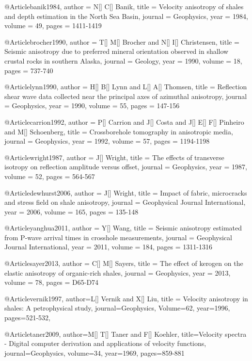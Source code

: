 @Article{banik1984,
  author = 	 {N[] C[] Banik},
  title = 	 {Velocity anisotropy of shales and depth estimation
in the North Sea Basin},
  journal = 	 {Geophysics},
  year = 	 1984,
  volume =	 49,
  pages =	 {1411-1419}
}

@Article{brocher1990,
  author = 	 {T[] M[] Brocher and N[] I[] Christensen},
  title = 	 {Seismic anisotropy due to preferred mineral orientation observed in shallow crustal rocks
in southern Alaska},
  journal = 	 {Geology},
  year = 	 1990,
  volume =	 18,
  pages =	 {737-740}
}

@Article{lynn1990,
  author = 	 {H[] B[] Lynn and L[] A[] Thomsen},
  title = 	 {Reflection shear wave data collected near the principal axes of azimuthal anisotropy},
  journal = 	 {Geophysics},
  year = 	 1990,
  volume =	 55,
  pages =	 {147-156}
}

@Article{carrion1992,
  author = 	 {P[] Carrion and J[] Costa and J[] E[] F[] Pinheiro and M[] Schoenberg},
  title = 	 {Crossborehole tomography in anisotropic media},
  journal = 	 {Geophysics},
  year = 	 1992,
  volume =	 57,
  pages =	 {1194-1198}
}

@Article{wright1987,
  author = 	 {J[] Wright},
  title = 	 {The effects of transverse isotropy on reflection amplitude versus offset},
  journal = 	 {Geophysics},
  year = 	 1987,
  volume =	 52,
  pages =	 {564-567}
}

@Article{dewhurst2006,
  author = 	 {J[] Wright},
  title = 	 {Impact of fabric, microcracks and stress field on shale anisotropy},
  journal = 	 {Geophysical Journal International},
  year = 	 2006,
  volume =	 165,
  pages =	 {135-148}
}

@Article{yanghua2011,
  author = 	 {Y[] Wang},
  title = 	 {Seismic anisotropy estimated from P-wave arrival times in crosshole measurements},
  journal = 	 {Geophysical Journal International},
  year = 	 2011,
  volume =	 184,
  pages =	 {1311-1316}
}

@Article{sayer2013,
  author = 	 {C[] M[] Sayers},
  title = 	 {The effect of kerogen on the elastic anisotropy of
organic-rich shales},
  journal = 	 {Geophysics},
  year = 	 2013,
  volume =	 78,
  pages =	 {D65-D74}
}

@Article{vernik1997,
  author={L[] Vernik and X[] Liu},
  title = {Velocity anisotropy in shales: A petrophysical study},
  journal={Geophysics},
  Volume=62,
  year=1996,
  pages={521-532},
}


@Article{taner2009,
author={M[] T[] Taner and F[] Koehler},
title={Velocity spectra - Digital computer derivation and applications of velocity functions},
journal={Geophysics},
volume=34,
year=1969,
pages={859-881}
}

